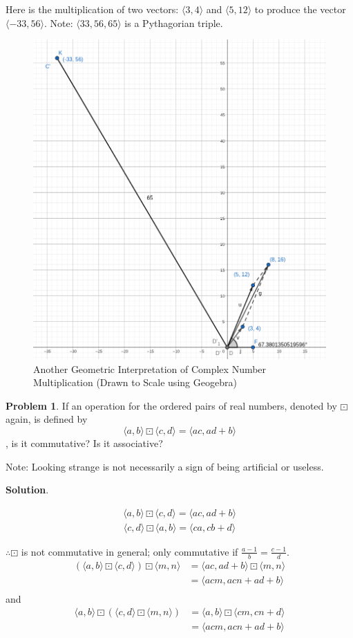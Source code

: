 \documentclass[english,notitlepage,smartquotes]{hgbreport}
\theoremstyle{definition}
\theoremstyle{definition}
\newtheorem{problem}{Problem}
\theoremstyle{remark}
\theoremstyle{definition}
\theoremstyle{plain}
\theoremstyle{definition}
\begin{document}
Here is the multiplication of two vectors: $\langle 3,4\rangle$ and $\langle 5,12\rangle$ to produce the vector $\langle -33,56\rangle$. Note: $\langle 33,56,65\rangle$ is a Pythagorian triple.
\begin{figure}[h]
\begin{center}
\caption{Another Geometric Interpretation of Complex Number Multiplication (Drawn to Scale using Geogebra)}
\label{fig:complexmult2}
\includegraphics[width=.5\textwidth]{c1xc2-2} 
\end{center}
\end{figure}

\begin{problem}
\label{pr:affine}
If an operation for the ordered pairs of real numbers, denoted by $\boxdot$ again, is defined by
$$
\langle a,b\rangle\boxdot\langle c,d\rangle=\langle ac,ad+b\rangle
$$
, is it commutative? Is it associative?

Note: Looking strange is not necessarily a sign of being artificial or useless.
\end{problem}

\textbf{Solution}.

\begin{align*}
\langle a,b\rangle\boxdot\langle c,d\rangle=\langle ac,ad+b\rangle
\end{align*}
\begin{align*}
\langle c,d\rangle\boxdot\langle a,b\rangle=\langle ca,cb+d\rangle
\end{align*}

$\therefore \boxdot$ is not commutative in general; only commutative if $\frac{a-1}{b}=\frac{c-1}{d}$.
\begin{align*}
(\langle a,b\rangle\boxdot\langle c,d\rangle)\boxdot\langle m, n\rangle
&=\langle ac, ad+b\rangle\boxdot\langle m,n\rangle\\
&=\langle acm,acn+ad+b\rangle\\
\end{align*}
and
\begin{align*}
\langle a,b\rangle\boxdot(\langle c,d\rangle\boxdot\langle m, n\rangle)
&=\langle a,b\rangle\boxdot\langle cm,cn+d\rangle\\
&=\langle acm,acn+ad+b\rangle\\
\end{align*}
\end{document}
